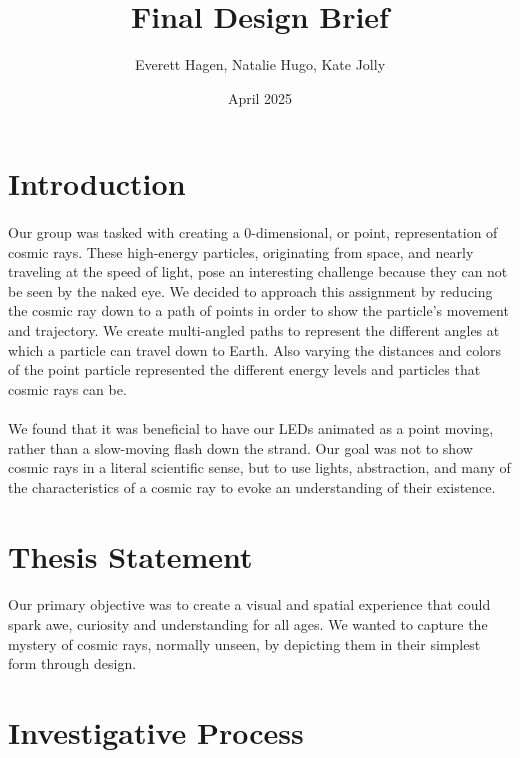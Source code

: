 \documentclass{article}
\title{Final Design Brief}
\author{Everett Hagen, Natalie Hugo, Kate Jolly}
\date{April 2025}
\begin{document}
\maketitle

\section{Introduction}
\paragraph{}Our group was tasked with creating a 0-dimensional, or point, representation of cosmic rays. These high-energy particles, originating from space, and nearly traveling at the speed of light, pose an interesting challenge because they can not be seen by the naked eye. We decided to approach this assignment by reducing the cosmic ray down to a path of points in order to show the particle's movement and trajectory. We create multi-angled paths to represent the different angles at which a particle can travel down to Earth. Also varying the distances and colors of the point particle represented the different energy levels and particles that cosmic rays can be. 
\paragraph{}We found that it was beneficial to have our LEDs animated as a point moving, rather than a slow-moving flash down the strand. Our goal was not to show cosmic rays in a literal scientific sense, but to use lights, abstraction, and many of the characteristics of a cosmic ray to evoke an understanding of their existence. 

\section{Thesis Statement}
\paragraph{}Our primary objective was to create a visual and spatial experience that could spark awe, curiosity and understanding for all ages. We wanted to capture the mystery of cosmic rays, normally unseen, by depicting them in their simplest form through design. 	

\section{Investigative Process}
\end{document}
